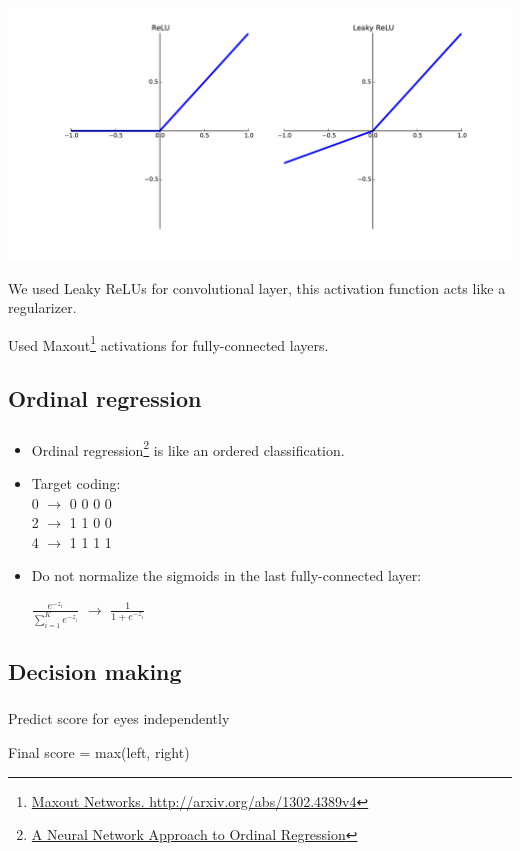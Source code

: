 \begin{frame}\frametitle{}
\begin{center}
\includegraphics[valign=t,scale=0.25]{pics/relus.pdf}
\end{center}
\par We used Leaky ReLUs for convolutional layer, this activation function acts like a regularizer.
\par Used Maxout\footnote{\href{http://arxiv.org/abs/1302.4389v4}{Maxout Networks. http://arxiv.org/abs/1302.4389v4}} activations for fully-connected layers.
\end{frame}

\subsection{Ordinal regression}

\begin{frame}\frametitle{}
\begin{itemize}

\item Ordinal regression\footnote{\href{https://web.missouri.edu/~zwyw6/files/rank.pdf}{A Neural Network Approach to Ordinal Regression}} is like an ordered classification.
\item Target coding: \\\vspace{0.25cm}
0 $\rightarrow$  0 0 0 0\\
2 $\rightarrow$  1 1 0 0\\
4 $\rightarrow$  1 1 1 1\\
\item Do not normalize the sigmoids in the last fully-connected layer:\\\vspace{0.5cm}
\begin{center}
\begin{Large}
$\frac{e^{-z_i}}{\sum\limits_{i=1}^Ke^{-z_i}}$ $\rightarrow$ $\frac{1}{1 + e^{-z_i}}$
\end{Large}
\end{center}
\end{itemize}
\end{frame}


\subsection{Decision making}

\begin{frame}\frametitle{}
\par Predict score for eyes independently
\par Final score = max(left, right)
\end{frame}


